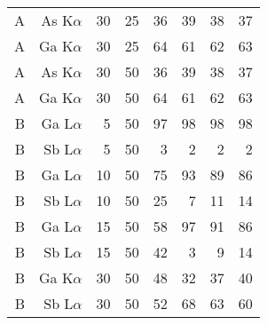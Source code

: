 \begin{table}[phtb]
\begin{center}
\begin{tabular}{rrrrrrrr}
            A               & As K$\alpha$  & 30             & 25             & 36                     & 39                      & 38                      & 37                      \\
            A               & Ga K$\alpha$  & 30             & 25             & 64                     & 61                      & 62                      & 63                      \\
            A               & As K$\alpha$  & 30             & 50             & 36                     & 39                      & 38                      & 37                      \\
            A               & Ga K$\alpha$  & 30             & 50             & 64                     & 61                      & 62                      & 63                      \\
            \hline
            B               & Ga L$\alpha$  & 5              & 50             & 97                     & 98                      & 98                      & 98                      \\
            B               & Sb L$\alpha$  & 5              & 50             & 3                      & 2                       & 2                       & 2                       \\
            B               & Ga L$\alpha$  & 10             & 50             & 75                     & 93                      & 89                      & 86                      \\
            B               & Sb L$\alpha$  & 10             & 50             & 25                     & 7                       & 11                      & 14                      \\
            B               & Ga L$\alpha$  & 15             & 50             & 58                     & 97                      & 91                      & 86                      \\
            B               & Sb L$\alpha$  & 15             & 50             & 42                     & 3                       & 9                       & 14                      \\
            B               & Ga K$\alpha$  & 30             & 50             & 48                     & 32                      & 37                      & 40                      \\
            B               & Sb L$\alpha$  & 30             & 50             & 52                     & 68                      & 63                      & 60                      \\

\end{tabular}
\end{center}
\end{table}
